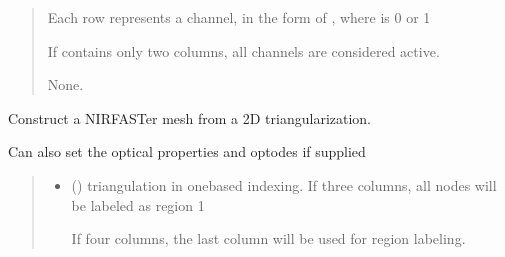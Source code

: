 \documentclass[letterpaper,10pt,english]{sphinxmanual}
\begin{document}
\begin{fulllineitems}
\begin{fulllineitems}
\begin{quote}
\begin{description}
\begin{itemize}
\sphinxAtStartPar
Each row represents a channel, in the form of , where  is 0 or 1

\sphinxAtStartPar
If  contains only two columns, all channels are considered active.


\end{itemize}

\sphinxAtStartPar
None.

\end{description}\end{quote}

\end{fulllineitems}


\begin{fulllineitems}
\label{\detokenize{_autosummary/nirfasterff.base.stnd_mesh.stndmesh:nirfasterff.base.stnd_mesh.stndmesh.from_triangle}}
\pysigstartsignatures
{}
\pysigstopsignatures
\sphinxAtStartPar
Construct a NIRFASTer mesh from a 2D triangularization.

\sphinxAtStartPar
Can also set the optical properties and optodes if supplied
\begin{quote}\begin{description}
\begin{itemize}
\item {} 
\sphinxAtStartPar
{} () \textendash{} 
\sphinxAtStartPar
triangulation in one\sphinxhyphen{}based indexing. If three columns, all nodes will be labeled as region 1

\sphinxAtStartPar
If four columns, the last column will be used for region labeling.



\end{itemize}
\end{description}
\end{quote}
\end{fulllineitems}
\end{fulllineitems}
\end{document}
